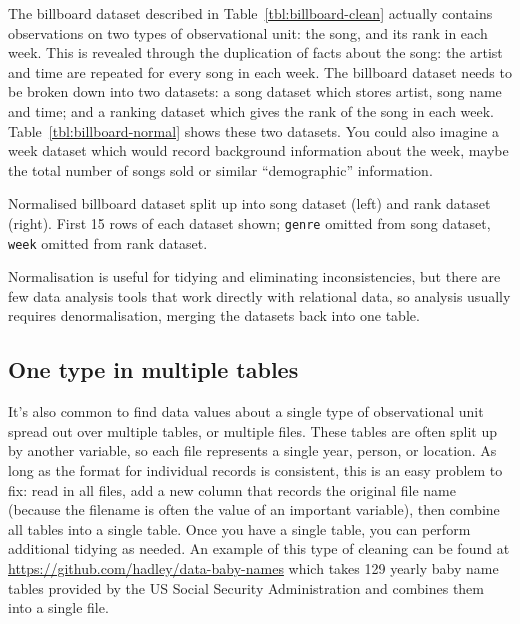 \documentclass[article]{jss}
\begin{document}
The billboard dataset described in Table~\ref{tbl:billboard-clean} actually contains observations on two types of observational unit: the song, and its rank in each week. This is revealed through the duplication of facts about the song: the artist and time are repeated for every song in each week. The billboard dataset needs to be broken down into two datasets: a song dataset which stores artist, song name and time; and a ranking dataset which gives the rank of the song in each week. Table~\ref{tbl:billboard-normal} shows these two datasets. You could also imagine a week dataset which would record background information about the week, maybe the total number of songs sold or similar ``demographic'' information.

\begin{table}
  \centering
  \hspace{2em}%
  

  \caption{Normalised billboard dataset split up into song dataset (left) and rank dataset (right). First 15 rows of each dataset shown; {\tt genre} omitted from song dataset, {\tt week} omitted from rank dataset.}
  \label{tbl:billboard-normal}
\end{table}

Normalisation is useful for tidying and eliminating inconsistencies, but there are few data analysis tools that work directly with relational data, so analysis usually requires denormalisation, merging the datasets back into one table. 


\subsection{One type in multiple tables}

It's also common to find data values about a single type of observational unit spread out over multiple tables, or multiple files. These tables are often split up by another variable, so each file represents a single year, person, or location. As long as the format for individual records is consistent, this is an easy problem to fix: read in all files, add a new column that records the original file name (because the filename is often the value of an important variable), then combine all tables into a single table. Once you have a single table, you can perform additional tidying as needed. An example of this type of cleaning can be found at \url{https://github.com/hadley/data-baby-names} which takes 129 yearly baby name tables provided by the US Social Security Administration and combines them into a single file.
\end{document}
